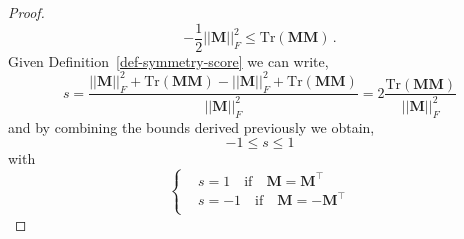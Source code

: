 \begin{proof}
\begin{equation}
    -\frac12 ||\bm{M}||_F^2  \leq \text{Tr}(\bm{M}\bm{M}) \,.
\end{equation}
%
Given Definition~\ref{def-symmetry-score} we can write,
%
\begin{equation}
    s = \frac{||\bm{M}||_F^2 + \text{Tr}(\bm{M}\bm{M}) - ||\bm{M}||_F^2 + \text{Tr}(\bm{M}\bm{M})}{||\bm{M}||_F^2 } = 2 \frac{\text{Tr}(\bm{M}\bm{M})}{||\bm{M}||_F^2 } 
\end{equation}
%
and by combining the bounds derived previously we obtain,
%
\begin{equation}
    -1 \leq s \leq 1    
\end{equation}
%
with 
%
\begin{equation}
\begin{cases}
& s = 1 \quad \text{if} \quad \bm{M} = \bm{M}^\top \\ 
& s = -1 \quad \text{if} \quad \bm{M} = - \bm{M}^\top \\ 
\end{cases}
\end{equation}
%


\end{proof}
